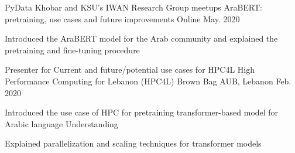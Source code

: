 

\begin{cventries}

  \cventry
   {PyData Khobar and KSU's IWAN Research Group meetups} %
    {AraBERT: pretraining, use cases and future improvements} %
    {Online} %
    {May. 2020} %
    {
      \begin{cvitems} %
        \item {Introduced the AraBERT model for the Arab community and explained the pretraining and fine-tuning procedure}
      \end{cvitems}
    }
  \cventry
    {Presenter for Current and future/potential use cases for HPC4L} %
    {High Performance Computing for Lebanon (HPC4L) Brown Bag} %
    {AUB, Lebanon} %
    {Feb. 2020} %
    {
      \begin{cvitems} %
        \item {Introduced the use case of HPC for pretraining transformer-based model for Arabic language Understanding}
        \item {Explained parallelization and scaling techniques for transformer models}
      \end{cvitems}
    }



\end{cventries}
